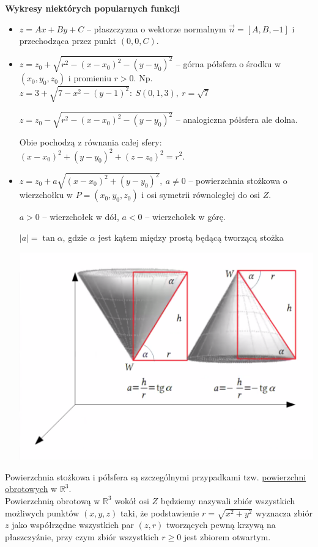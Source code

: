 \textbf{Wykresy niektórych popularnych funkcji}

\begin{itemize}
    \item $ z = Ax + By + C $ -- płaszczyzna o wektorze normalnym $ \vec{n} = [A, B, -1] $ i przechodząca przez punkt $ (0,0,C) $.
    \item $ z = z_0 + \sqrt{r^2 - (x-x_0)^2 - (y-y_0)^2} $ -- górna półsfera o środku w $(x_0, y_0, z_0)$ i promieniu $r > 0$. Np.
    $ z = 3 + \sqrt{7 - x^2 - (y-1)^2} : \ S(0,1,3), \ r=\sqrt{7} $

    $ z = z_0 - \sqrt{r^2 - (x-x_0)^2 - (y-y_0)^2} $ -- analogiczna półsfera ale dolna.

    Obie pochodzą z równania całej sfery: $ (x - x_0)^2 + (y - y_0)^2 + (z - z_0)^2 = r^2 $.
    \item $ z = z_0 + a\sqrt{(x-x_0)^2 + (y-y_0)^2}, \ a \neq 0 $ -- powierzchnia stożkowa o wierzchołku w $ P = (x_0,y_0,z_0) $
    i osi symetrii równoległej do osi $Z$.

    $a > 0$ -- wierzchołek w dół, $a < 0$ -- wierzchołek w górę.

    $|a| = \tan \alpha $, gdzie $\alpha$ jest kątem między prostą będącą tworzącą stożka

    \includegraphics[scale=0.5]{img/stozek_wlzm.png}
\end{itemize}

Powierzchnia stożkowa i półsfera są szczególnymi przypadkami tzw. \underline{powierzchni obrotowych} w $\mathbb{R}^3$. \\

Powierzchnią obrotową w $\mathbb{R}^3$ wokół osi $Z$ będziemy nazywali zbiór wszystkich możliwych punktów
$(x,y,z)$ taki, że podstawienie $r = \sqrt{x^2 + y^2}$ wyznacza zbiór $z$ jako współrzędne wszystkich par $(z,r)$
tworzących pewną krzywą na płaszczyźnie, przy czym zbiór wszystkich $r \geq 0$ jest zbiorem otwartym.

